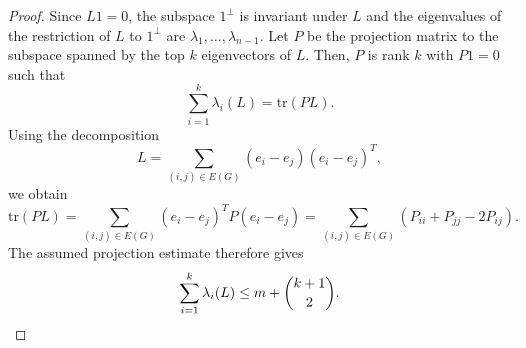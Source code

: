 \documentclass[10pt,a4paper]{amsart}
\newcommand{\tr}{\text{tr} }
\begin{document}
\begin{proof}
Since $L1=0$, the subspace $1^{\perp}$ is invariant under $L$ and the eigenvalues of the restriction of $L$ to $1^{\perp}$ are $\lambda_1,\ldots,\lambda_{n-1}$. Let $P$ be the projection matrix to the subspace spanned by the top $k$ eigenvectors of $L$. Then, $P$ is rank $k$ with $P1=0$ such that
\[
    \sum\limits_{i=1}^{k}\lambda_i(L)=\tr(PL).
\]
Using the decomposition
\[
    L=\sum\limits_{(i,j)\in E(G)}(e_i-e_j)(e_i-e_j)^T,
\]
we obtain
\[
    \tr(PL)
    =\sum\limits_{(i,j)\in E(G)}(e_i-e_j)^TP(e_i-e_j)
    =\sum\limits_{(i,j)\in E(G)}(P_{ii}+P_{jj}-2P_{ij}).
\]
The assumed projection estimate therefore gives
\[
    \sum\limits_{i=1}^{k}\lambda_i(L)
    \le m+\dbinom{k+1}{2}.
\]
\end{proof}
\end{document}
